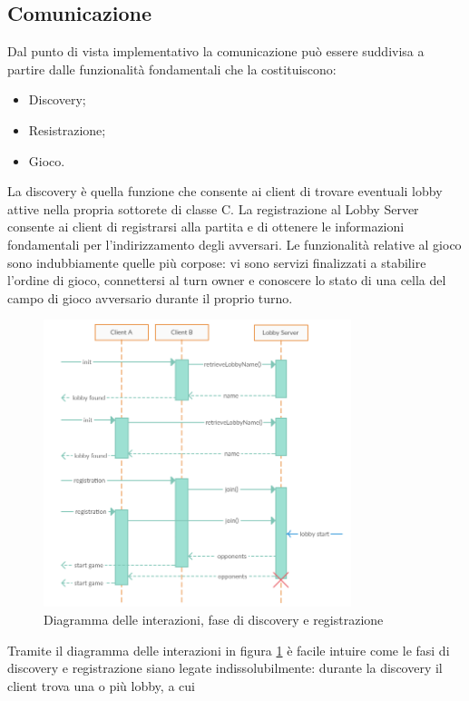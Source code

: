 \subsection{Comunicazione}
Dal punto di vista implementativo la comunicazione può essere suddivisa a 
partire dalle funzionalità fondamentali che la costituiscono:
\begin{itemize}
 \item Discovery;
 \item Resistrazione;
 \item Gioco.
\end{itemize}
La discovery è quella funzione che consente ai client di trovare eventuali 
lobby attive nella propria sottorete di classe C. La registrazione al Lobby 
Server consente ai client di registrarsi alla partita e di ottenere le 
informazioni fondamentali per l'indirizzamento degli avversari. Le funzionalità 
relative al gioco sono indubbiamente quelle più corpose: vi sono servizi 
finalizzati a stabilire l'ordine di gioco, connettersi al turn owner e 
conoscere lo stato di una cella del campo di gioco avversario durante il 
proprio turno.
\begin{figure}[!ht]
    \centering
    \includegraphics[width=0.8\textwidth]{core/imgs/UML/sequence/discovery.png}
    \caption{Diagramma delle interazioni, fase di discovery e registrazione}
    \label{fig:discoveryseq}
\end{figure}
Tramite il diagramma delle interazioni in figura \ref{fig:discoveryseq} 
è facile intuire come le fasi di discovery e registrazione siano legate 
indissolubilmente: durante la discovery il client trova una o più lobby, a cui 
